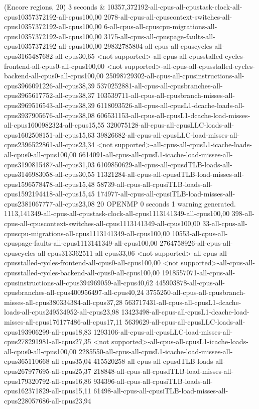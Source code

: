 (Encore regions, 20) 3 seconds
&
10357,372192-all-cpus-all-cpustask-clock-all-cpus10357372192-all-cpus100,00
2078-all-cpus-all-cpuscontext-switches-all-cpus10357372192-all-cpus100,00
6-all-cpus-all-cpuscpu-migrations-all-cpus10357372192-all-cpus100,00
3175-all-cpus-all-cpuspage-faults-all-cpus10357372192-all-cpus100,00
29832785804-all-cpus-all-cpuscycles-all-cpus3165487682-all-cpus30,65
<not supported>-all-cpus-all-cpusstalled-cycles-frontend-all-cpus0-all-cpus100,00
<not supported>-all-cpus-all-cpusstalled-cycles-backend-all-cpus0-all-cpus100,00
25098729302-all-cpus-all-cpusinstructions-all-cpus3966091226-all-cpus38,39
5370252881-all-cpus-all-cpusbranches-all-cpus3965617752-all-cpus38,37
103539711-all-cpus-all-cpusbranch-misses-all-cpus3969516543-all-cpus38,39
6118093526-all-cpus-all-cpusL1-dcache-loads-all-cpus3937905676-all-cpus38,08
606531153-all-cpus-all-cpusL1-dcache-load-misses-all-cpus1600982324-all-cpus15,55
320075128-all-cpus-all-cpusLLC-loads-all-cpus1602508151-all-cpus15,63
39826682-all-cpus-all-cpusLLC-load-misses-all-cpus2396522861-all-cpus23,34
<not supported>-all-cpus-all-cpusL1-icache-loads-all-cpus0-all-cpus100,00
6614091-all-cpus-all-cpusL1-icache-load-misses-all-cpus3190815487-all-cpus31,03
6109850629-all-cpus-all-cpusdTLB-loads-all-cpus3146983058-all-cpus30,55
11321284-all-cpus-all-cpusdTLB-load-misses-all-cpus1596578478-all-cpus15,48
58739-all-cpus-all-cpusiTLB-loads-all-cpus1592194418-all-cpus15,45
174977-all-cpus-all-cpusiTLB-load-misses-all-cpus2381067777-all-cpus23,08
20 OPENMP 0 seconds
1 warning generated.
1113,141349-all-cpus-all-cpustask-clock-all-cpus1113141349-all-cpus100,00
398-all-cpus-all-cpuscontext-switches-all-cpus1113141349-all-cpus100,00
33-all-cpus-all-cpuscpu-migrations-all-cpus1113141349-all-cpus100,00
10553-all-cpus-all-cpuspage-faults-all-cpus1113141349-all-cpus100,00
2764758926-all-cpus-all-cpuscycles-all-cpus313362511-all-cpus33,06
<not supported>-all-cpus-all-cpusstalled-cycles-frontend-all-cpus0-all-cpus100,00
<not supported>-all-cpus-all-cpusstalled-cycles-backend-all-cpus0-all-cpus100,00
1918557071-all-cpus-all-cpusinstructions-all-cpus394969059-all-cpus40,62
445903878-all-cpus-all-cpusbranches-all-cpus400956497-all-cpus40,24
3755250-all-cpus-all-cpusbranch-misses-all-cpus380334384-all-cpus37,28
563717431-all-cpus-all-cpusL1-dcache-loads-all-cpus249534952-all-cpus23,98
13423498-all-cpus-all-cpusL1-dcache-load-misses-all-cpus176177486-all-cpus17,11
5639629-all-cpus-all-cpusLLC-loads-all-cpus193906299-all-cpus18,83
1293106-all-cpus-all-cpusLLC-load-misses-all-cpus278291981-all-cpus27,35
<not supported>-all-cpus-all-cpusL1-icache-loads-all-cpus0-all-cpus100,00
2285550-all-cpus-all-cpusL1-icache-load-misses-all-cpus365110668-all-cpus35,04
415520258-all-cpus-all-cpusdTLB-loads-all-cpus267977695-all-cpus25,37
218848-all-cpus-all-cpusdTLB-load-misses-all-cpus179320792-all-cpus16,86
934396-all-cpus-all-cpusiTLB-loads-all-cpus162371829-all-cpus15,11
61498-all-cpus-all-cpusiTLB-load-misses-all-cpus228057686-all-cpus23,94
